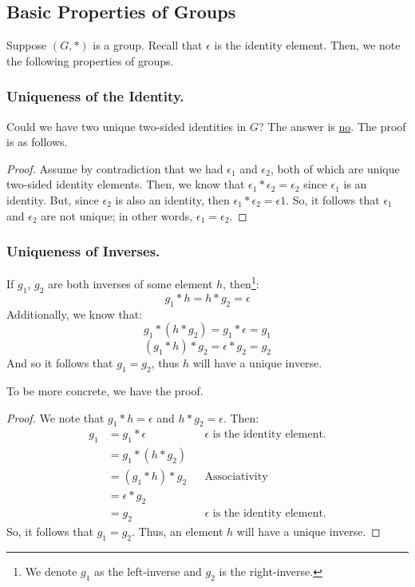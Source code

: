 \documentclass[letterpaper]{article}
\begin{document}
\subsection{Basic Properties of Groups}
Suppose $(G, *)$ is a group. Recall that $\epsilon$ is the identity element. Then, we note the following properties of groups. 

\subsubsection{Uniqueness of the Identity.} 
Could we have two unique two-sided identities in $G$? The answer is \underline{no}. The proof is as follows. 

\begin{framed}
    \begin{proof}
        Assume by contradiction that we had $\epsilon_1$ and $\epsilon_2$, both of which are unique two-sided identity elements. Then, we know that $\epsilon_1 * \epsilon_2 = \epsilon_2$ since $\epsilon_1$ is an identity. But, since $\epsilon_2$ is also an identity, then $\epsilon_1 * \epsilon_2 = \epsilon1$. So, it follows that $\epsilon_1$ and $\epsilon_2$ are not unique; in other words, $\epsilon_1 = \epsilon_2$. 
    \end{proof}
\end{framed}

\subsubsection{Uniqueness of Inverses.}

If $g_1$, $g_2$ are both inverses of some element $h$, then\footnote{We denote $g_1$ as the left-inverse and $g_2$ is the right-inverse.}:
\[g_1 * h = h * g_2 = \epsilon\]
Additionally, we know that:
\[g_1 * (h * g_2) = g_1 * \epsilon = g_1\]
\[(g_1 * h) * g_2 = \epsilon * g_2 = g_2\]
And so it follows that $g_1 = g_2$, thus $h$ will have a unique inverse. 

\bigskip 

To be more concrete, we have the proof. 
\begin{framed}
    \begin{proof}
        We note that $g_1 * h = \epsilon$ and $h * g_2 = \epsilon$. Then:
        \begin{equation*}
            \begin{aligned}
                g_1 &= g_1 * \epsilon && \epsilon \text{ is the identity element.} \\ 
                    &= g_1 * (h * g_2) \\ 
                    &= (g_1 * h) * g_2 && \text{Associativity} \\ 
                    &= \epsilon * g_2 \\ 
                    &= g_2 && \epsilon \text{ is the identity element.}
            \end{aligned}
        \end{equation*}
        So, it follows that $g_1 = g_2$. Thus, an element $h$ will have a unique inverse. 
    \end{proof}
\end{framed}
\end{document}
